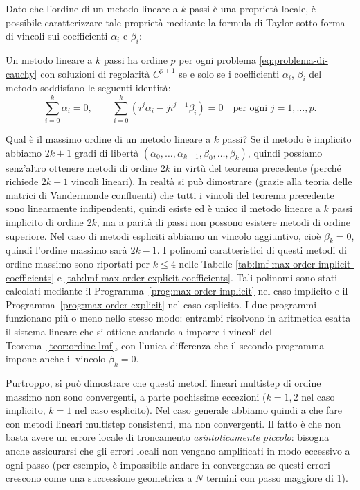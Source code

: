 Dato che l'ordine di un metodo lineare a $k$ passi è una proprietà locale,
è possibile caratterizzare tale proprietà mediante la formula di Taylor
sotto forma di vincoli sui coefficienti $\alpha_i$ e $\beta_i$:
\begin{teor} \label{teor:ordine-lmf}
Un metodo lineare a $k$ passi ha ordine $p$ per ogni problema
\eqref{eq:problema-di-cauchy} con soluzioni di regolarità $C^{p+1}$
se e solo se i coefficienti $\alpha_i$, $\beta_i$ del metodo soddisfano
le seguenti identità:
\begin{equation} \label{eq:ordine-lmf}
\sum_{i=0}^k \alpha_i = 0,
\qquad \sum_{i=0}^k (i^j \alpha_i - j i^{j-1} \beta_i) = 0
\quad \text{per ogni $j = 1,\dots,p$.}
\end{equation}
\end{teor}
\noindent Qual è il massimo ordine di un metodo lineare a $k$ passi?
Se il metodo è implicito abbiamo $2k+1$ gradi di libertà
$(\alpha_0,\dots,\alpha_{k-1},\beta_0,\dots,\beta_k)$,
quindi possiamo senz'altro ottenere metodi di ordine $2k$ in virtù
del teorema precedente (perché richiede $2k+1$ vincoli lineari).
In realtà si può dimostrare (grazie alla teoria delle matrici di Vandermonde
confluenti) che tutti i vincoli del teorema precedente sono linearmente
indipendenti, quindi esiste ed è unico il metodo lineare a $k$ passi
implicito di ordine $2k$, ma a parità di passi non possono esistere metodi
di ordine superiore. Nel caso di metodi espliciti abbiamo un vincolo aggiuntivo,
cioè $\beta_k = 0$, quindi l'ordine massimo sarà $2k-1$.
I polinomi caratteristici di questi metodi di ordine massimo sono riportati
per $k \leq 4$ nelle Tabelle \ref{tab:lmf-max-order-implicit-coefficients}
e \ref{tab:lmf-max-order-explicit-coefficients}.
Tali polinomi sono stati calcolati mediante il
Programma~\ref{prog:max-order-implicit} nel caso implicito
e il Programma~\ref{prog:max-order-explicit} nel caso esplicito.
I due programmi funzionano più o meno nello stesso modo:
entrambi risolvono in aritmetica esatta il sistema lineare
che si ottiene andando a imporre i vincoli del Teorema~\ref{teor:ordine-lmf},
con l'unica differenza che il secondo programma impone anche
il vincolo $\beta_k = 0$.

Purtroppo, si può dimostrare che questi metodi lineari multistep
di ordine massimo non sono convergenti, a parte pochissime eccezioni
($k=1,2$ nel caso implicito, $k=1$ nel caso esplicito).
Nel caso generale abbiamo quindi a che fare con metodi lineari multistep
consistenti, ma non convergenti.
Il fatto è che non basta avere un errore locale di troncamento
\emph{asintoticamente piccolo}: bisogna anche assicurarsi che gli errori
locali non vengano amplificati in modo eccessivo a ogni passo
(per esempio, è impossibile andare in convergenza se questi errori
crescono come una successione geometrica a $N$ termini con passo maggiore di 1).

